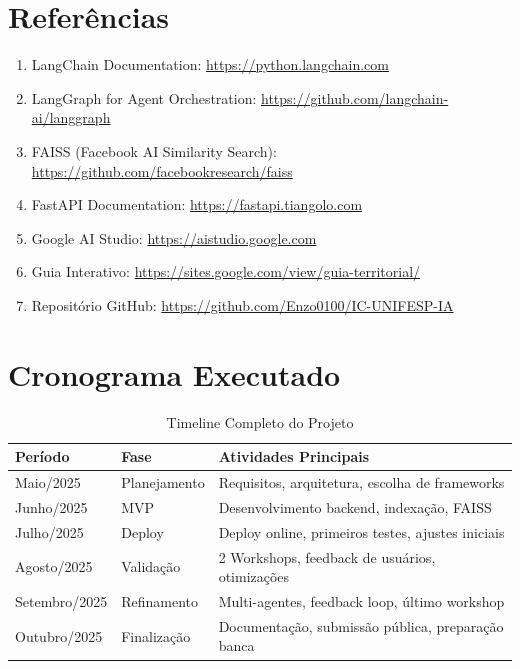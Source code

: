 \documentclass[12pt,a4paper]{report}
\begin{document}
\newpage

\chapter*{Referências}

\begin{enumerate}
  \item LangChain Documentation: \url{https://python.langchain.com}
  \item LangGraph for Agent Orchestration: \url{https://github.com/langchain-ai/langgraph}
  \item FAISS (Facebook AI Similarity Search): \url{https://github.com/facebookresearch/faiss}
  \item FastAPI Documentation: \url{https://fastapi.tiangolo.com}
  \item Google AI Studio: \url{https://aistudio.google.com}
  \item Guia Interativo: \url{https://sites.google.com/view/guia-territorial/}
  \item Repositório GitHub: \url{https://github.com/Enzo0100/IC-UNIFESP-IA}
\end{enumerate}

\appendix

\chapter{Cronograma Executado}

\begin{table}[H]
\centering
\caption{Timeline Completo do Projeto}
\begin{tabular}{|l|l|l|}
\hline
\textbf{Período} & \textbf{Fase} & \textbf{Atividades Principais} \\
\hline
Maio/2025 & Planejamento & Requisitos, arquitetura, escolha de frameworks \\
\hline
Junho/2025 & MVP & Desenvolvimento backend, indexação, FAISS \\
\hline
Julho/2025 & Deploy & Deploy online, primeiros testes, ajustes iniciais \\
\hline
Agosto/2025 & Validação & 2 Workshops, feedback de usuários, otimizações \\
\hline
Setembro/2025 & Refinamento & Multi-agentes, feedback loop, último workshop \\
\hline
Outubro/2025 & Finalização & Documentação, submissão pública, preparação banca \\
\hline
\end{tabular}
\end{table}
\end{document}
